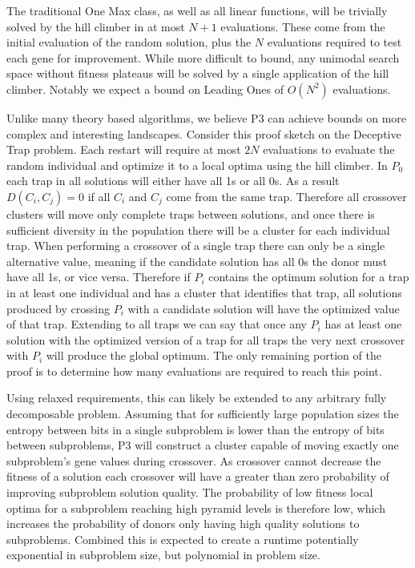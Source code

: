 \documentclass{sig-alternate}
\begin{document}
The traditional One Max class, as well as all linear functions, will be
trivially solved by the hill climber in at most $N+1$ evaluations.  These come
from the initial evaluation of the random solution, plus the $N$ evaluations required
to test each gene for improvement.  While more difficult to bound, any unimodal
search space without fitness plateaus will be solved by a single application
of the hill climber.  Notably we expect a bound on Leading Ones of $O(N^2)$ evaluations.

Unlike many theory based algorithms, we believe P3 can achieve bounds on more
complex and interesting landscapes.  Consider this proof sketch on the Deceptive
Trap problem.  Each restart will require at most $2N$ evaluations to evaluate the
random individual and optimize it to a local optima using the hill climber.  In
$P_0$ each trap in all solutions will either have all 1s or all 0s.  As a result $D(C_i, C_j) = 0$
if all $C_i$ and $C_j$ come from the same trap.  Therefore all crossover clusters
will move only complete traps between solutions, and once there is sufficient
diversity in the population there will be a cluster for each individual trap.
When performing a crossover of a single trap there can only be a single alternative
value, meaning if the candidate solution has all 0s the donor must have all 1s, or vice
versa.  Therefore if $P_i$ contains the optimum solution for a trap in at least one
individual and has a cluster that identifies that trap, all solutions produced by crossing
$P_i$ with a candidate solution will have the optimized value of that trap.  Extending to
all traps we can say that once any $P_i$ has at least one solution with the optimized
version of a trap for all traps the very next crossover with $P_i$ will produce the global optimum.
The only remaining portion of the proof is to determine how many evaluations are required to reach this point.

Using relaxed requirements, this can likely be extended to any arbitrary fully decomposable
problem. Assuming that for sufficiently large population sizes the entropy between
bits in a single subproblem is lower than the entropy of bits between subproblems,
P3 will construct a cluster capable of moving exactly one subproblem's gene values
during crossover.  As crossover cannot decrease the fitness of a solution each
crossover will have a greater than zero probability of improving subproblem solution quality.
The probability of low fitness local optima for a subproblem reaching high pyramid levels
is therefore low, which increases the probability of donors only having high quality
solutions to subproblems.  Combined this is expected to create a runtime potentially
exponential in subproblem size, but polynomial in problem size.
\end{document}
